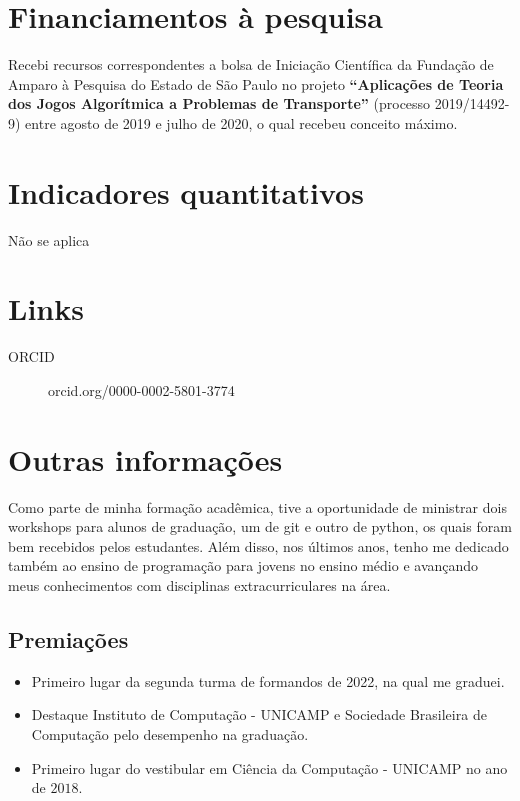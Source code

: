 \documentclass[11pt]{article}
\begin{document}
\section*{Financiamentos à pesquisa}
\label{sec:orgd903a3a}
Recebi recursos correspondentes a bolsa de Iniciação Científica da Fundação de Amparo à Pesquisa do Estado de São Paulo no projeto \textbf{``Aplicações de Teoria dos Jogos Algorítmica a Problemas de Transporte''} (processo 2019/14492-9) entre agosto de 2019 e julho de 2020, o qual recebeu conceito máximo.
\section*{Indicadores quantitativos}
\label{sec:org3ef57ea}
Não se aplica
\section*{Links}
\label{sec:orgeb45a3b}
\begin{description}
\item[{ORCID}] orcid.org/0000-0002-5801-3774
\end{description}
\section*{Outras informações}
\label{sec:orgd8a9cb8}
Como parte de minha formação acadêmica, tive a oportunidade de ministrar dois workshops para alunos de graduação, um de git e outro de python, os quais foram bem recebidos pelos estudantes.
Além disso, nos últimos anos, tenho me dedicado também ao ensino de programação para jovens no ensino médio e avançando meus conhecimentos com disciplinas extracurriculares na área.

\subsection*{Premiações}
\label{sec:orgeb3822b}
\begin{itemize}
\item Primeiro lugar da segunda turma de formandos de 2022, na qual me graduei.
\item Destaque Instituto de Computação - UNICAMP e Sociedade Brasileira de Computação pelo desempenho na graduação.
\item Primeiro lugar do vestibular em Ciência da Computação - UNICAMP no ano de $2018$.
\end{itemize}
\end{document}
